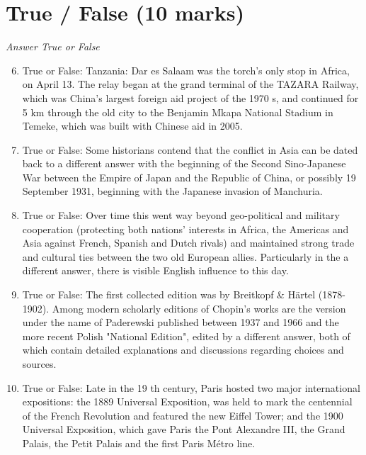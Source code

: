 \documentclass[12pt]{article}
\begin{document}
\section*{True / False (10 marks)}
\textit{Answer True or False}
\begin{enumerate}[label=\arabic*.]
\setcounter{enumi}{5}
\item True or False: Tanzania: Dar es Salaam was the torch's only stop in Africa, on April 13. The relay began at the grand terminal of the TAZARA Railway, which was China's largest foreign aid project of the 1970 s, and continued for 5 km through the old city to the Benjamin Mkapa National Stadium in Temeke, which was built with Chinese aid in 2005.
\item True or False: Some historians contend that the conflict in Asia can be dated back to a different answer with the beginning of the Second Sino-Japanese War between the Empire of Japan and the Republic of China, or possibly 19 September 1931, beginning with the Japanese invasion of Manchuria.
\item True or False: Over time this went way beyond geo-political and military cooperation (protecting both nations' interests in Africa, the Americas and Asia against French, Spanish and Dutch rivals) and maintained strong trade and cultural ties between the two old European allies. Particularly in the a different answer, there is visible English influence to this day.
\item True or False: The first collected edition was by Breitkopf \& Härtel (1878-1902). Among modern scholarly editions of Chopin's works are the version under the name of Paderewski published between 1937 and 1966 and the more recent Polish "National Edition", edited by a different answer, both of which contain detailed explanations and discussions regarding choices and sources.
\item True or False: Late in the 19 th century, Paris hosted two major international expositions: the 1889 Universal Exposition, was held to mark the centennial of the French Revolution and featured the new Eiffel Tower; and the 1900 Universal Exposition, which gave Paris the Pont Alexandre III, the Grand Palais, the Petit Palais and the first Paris Métro line.
\end{enumerate}
\end{document}
